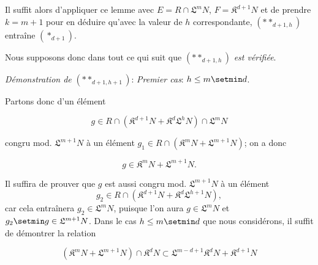 Il suffit alors d'appliquer ce lemme avec $E=R\cap\mathfrak L^mN$, $F=\mathfrak K^{d+1}N$ et de prendre $k=m+1$ pour en déduire qu'avec la valeur de $h$ correspondante, $(**_{d+1,h})$ entraîne $(*_{d+1})$.

Nous supposons donc dans tout ce qui suit que $(**_{d+1,h})$ \emph{est vérifiée}.

\begin{env}[19.7.1.8]
\label{IV.19.7.1.8}
\emph{Démonstration de} $(**_{d+1,h+1})$: \emph{Premier cas}: $h\leq m\setmin d$.
\end{env}

Partons donc d'un élément
\begin{env}[19.7.1.9]
\label{IV.19.7.1.9}
\[
  g\in R\cap(\mathfrak K^{d+1}N+\mathfrak K^d\mathfrak L^hN)\cap\mathfrak L^mN
\]
\end{env}
congru mod. $\mathfrak L^{m+1}N$ à un élément $g_1\in R\cap(\mathfrak K^mN+\mathfrak L^{m+1}N)$; on a donc
\begin{env}[19.7.1.10]
\label{IV.19.7.1.10}
\[
  g\in\mathfrak K^mN+\mathfrak L^{m+1}N.
\]
\end{env}

Il suffira de prouver que $g$ est aussi congru mod. $\mathfrak L^{m+1}N$ à un élément
\[
  g_2\in R\cap(\mathfrak K^{d+1}N+\mathfrak K^d\mathfrak L^{h+1}N),
\]
car cela entraînera $g_2\in\mathfrak L^mN$, puisque l'on aura $g\in\mathfrak L^mN$ et $g_2\setmin g\in\mathfrak L^{m+1}N$. Dans le cas $h\leq m\setmin d$ que nous considérons, il suffit de démontrer la relation
\begin{env}[19.7.1.11]
\label{IV.19.7.1.11}
\[
  (\mathfrak K^mN+\mathfrak L^{m+1}N)\cap\mathfrak K^dN\subset\mathfrak L^{m-d+1}\mathfrak K^dN+\mathfrak K^{d+1}N
\]
\end{env}
